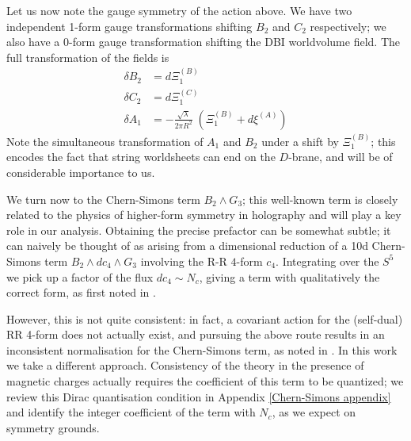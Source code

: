 \documentclass[aps,preprint,nofootinbib,preprintnumbers,eqsecnum,superscriptaddress]{revtex4}
\begin{document}
Let us now note the gauge symmetry of the action above. We have two independent 1-form gauge transformations shifting $B_2$ and $C_2$ respectively; we also have a 0-form gauge transformation shifting the DBI worldvolume field. The full transformation of the fields is
\begin{subequations}
	\begin{align}
		\delta B_2 &= d \Xi^{(B)}_1				\\
		\delta C_2 &= d \Xi^{(C)}_1				\\
		\delta A_1 &= - \frac{\sqrt{\lambda}}{2 \pi R^2} \; \left(\Xi^{(B)}_1 + d\xi^{(A)}\right)
	\end{align} 
\end{subequations}
Note the simultaneous transformation of $A_1$ and $B_2$ under a shift by $\Xi^{(B)}_1$; this encodes the fact that string worldsheets can end on the $D$-brane, and will be of considerable importance to us. 


We turn now to the Chern-Simons term $B_2 \wedge G_3$; this well-known term \cite{Aharony:1998qu, Maldacena:2001ss, Witten:1998xy} is closely related to the physics of higher-form symmetry in holography \cite{Hofman:2017vwr} and will play a key role in our analysis. Obtaining the precise prefactor can be somewhat subtle; it can naively be thought of as arising from a dimensional reduction of a 10d Chern-Simons term $B_2 \wedge dc_4 \wedge G_3$ involving the R-R $4$-form $c_4$. Integrating over the $S^5$ we pick up a factor of the flux $dc_4 \sim N_c$, giving a term with qualitatively the correct form, as first noted in \cite{Witten:1998xy}. 

However, this is not quite consistent: in fact, a covariant action for the (self-dual) RR 4-form does not actually exist, and pursuing the above route results in an inconsistent normalisation for the Chern-Simons term, as noted in \cite{Belov:2004ht}. In this work we take a different approach. Consistency of the theory in the presence of magnetic charges actually requires the coefficient of this term to be quantized; we review this Dirac quantisation condition in Appendix \ref{Chern-Simons appendix} and identify the integer coefficient of the term with $N_c$, as we expect on symmetry grounds.
\end{document}
